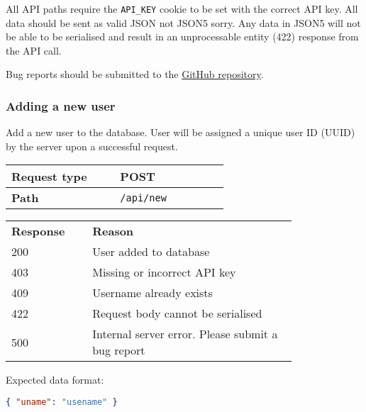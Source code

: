 \documentclass{../../Reports/custom}
\begin{document}
All API paths require the \texttt{API\_KEY} cookie to be set with the correct API key. All data should be sent as valid JSON not JSON5 sorry. Any data in JSON5 will not be able to be serialised and result in an unprocessable entity (422) response from the API call.

Bug reports should be submitted to the \href{https://github.com/RosiePuddles/Year2Project/issues}{GitHub repository}.

\subsubsection{Adding a new user}

Add a new user to the database. User will be assigned a unique user ID (UUID) by the server upon a successful request.

\begin{multicols}{2}

\begin{center}
	\begin{tabular}{|p{0.4\linewidth}|p{0.4\linewidth}|}
	\hline
		\textbf{Request type} & POST \\\hline
		\textbf{Path} & \texttt{/api/new} \\\hline
	\end{tabular}
\end{center}
\columnbreak

\begin{center}
	\begin{tabular}{|p{0.225\linewidth}|p{0.575\linewidth}|}
	\hline
		\textbf{Response} & \textbf{Reason} \\\Xhline{3\arrayrulewidth}
		200 & User added to database \\\hline
		403 & Missing or incorrect API key \\\hline
		409 & Username already exists \\\hline
		422 & Request body cannot be serialised \\\hline
		500 & Internal server error. Please submit a bug report \\\hline
	\end{tabular}
\end{center}
	
\end{multicols}

Expected data format:

\begin{lstlisting}[language=json]
{ "uname": "usename" }
\end{lstlisting}
\end{document}
